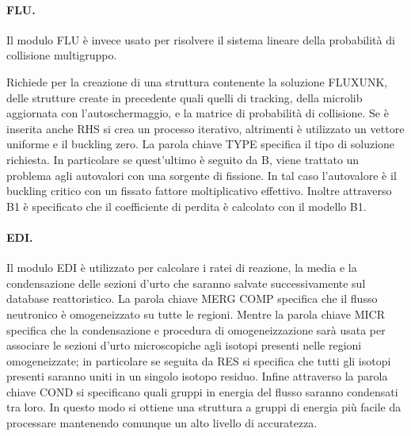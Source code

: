 \paragraph{FLU.}
Il modulo FLU è invece usato per risolvere il sistema lineare della 
probabilità di collisione multigruppo.

Richiede per la creazione di una struttura contenente la soluzione FLUXUNK, 
delle strutture create in precedente quali quelli di tracking, della microlib 
aggiornata con l'autoschermaggio, e la matrice di probabilità di collisione. 
Se è inserita anche RHS si crea un processo iterativo, altrimenti è 
utilizzato 
un vettore uniforme e il buckling zero.
La parola chiave TYPE specifica il tipo di soluzione richiesta. 
In particolare se quest'ultimo è seguito da B, viene trattato un problema agli 
autovalori con una sorgente di fissione. 
In tal caso l'autovalore è il buckling critico con un fissato fattore 
moltiplicativo effettivo.
Inoltre attraverso B1 è specificato che il coefficiente di perdita è calcolato 
con il modello B1.

\paragraph{EDI.}
Il modulo EDI è utilizzato per calcolare i ratei di reazione, la media e la 
condensazione delle sezioni d'urto che saranno salvate successivamente sul 
database reattoristico.
La parola chiave MERG COMP specifica che il flusso neutronico è omogeneizzato 
su 
tutte le regioni.
Mentre la parola chiave MICR specifica che la condensazione e procedura di 
omogeneizzazione sarà usata per associare le sezioni d'urto microscopiche agli 
isotopi presenti nelle regioni omogeneizzate; in particolare se seguita da RES 
si specifica che tutti gli isotopi presenti saranno uniti in un singolo isotopo 
residuo.
Infine attraverso la parola chiave COND si specificano quali gruppi in energia 
del flusso saranno condensati tra loro.
In questo modo si ottiene una struttura a gruppi di energia più facile da 
processare mantenendo comunque un alto livello di accuratezza.
